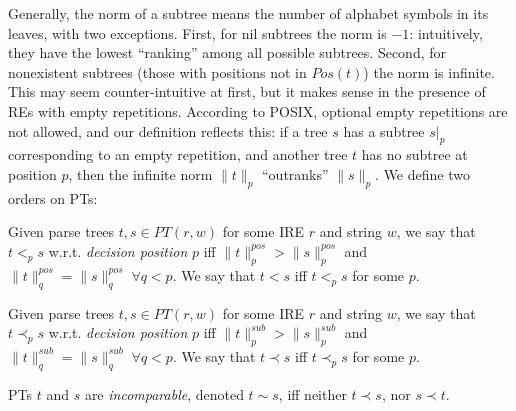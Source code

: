 \documentclass[AMA,STIX1COL]{WileyNJD-v2}
\newcommand{\pnorm}[2]{\|{#1}\|^{pos}_{#2}}
\newcommand{\snorm}[2]{\|{#1}\|^{sub}_{#2}}
\begin{document}
Generally, the norm of a subtree means the number of alphabet symbols in its leaves, with two exceptions.
First, for nil subtrees the norm is $-1$: intuitively, they have the lowest ``ranking'' among all possible subtrees.
Second, for nonexistent subtrees (those with positions not in $Pos(t)$) the norm is infinite.
This may seem counter-intuitive at first, but it makes sense in the presence of REs with empty repetitions.
According to POSIX, optional empty repetitions are not allowed, and our definition reflects this:
if a tree $s$ has a subtree $s|_p$ corresponding to an empty repetition,
and another tree $t$ has no subtree at position $p$,
then the infinite norm $\|t\|_p$ ``outranks'' $\|s\|_p$.
We define two orders on PTs:

    \begin{definition}
    \label{total_order_on_PTs}
    Given parse trees $t, s \in PT(r, w)$ for some IRE $r$ and string $w$, we say that $t <_p s$ w.r.t. \emph{decision position} $p$
    iff $\pnorm{t}{p} > \pnorm{s}{p}$ and $\pnorm{t}{q} = \pnorm{s}{q} \; \forall q < p$.
    We say that $t < s$ iff $t <_p s$ for some $p$.
    \end{definition}

    \begin{definition}
    \label{partial_order_on_PTs}
    Given parse trees $t, s \in PT(r, w)$ for some IRE $r$ and string $w$, we say that $t \prec_p s$ w.r.t. \emph{decision position} $p$ %
    iff $\snorm{t}{p} > \snorm{s}{p}$ and $\snorm{t}{q} = \snorm{s}{q} \; \forall q < p$.
    We say that $t \prec s$ iff $t \prec_p s$ for some $p$.
    \end{definition}

    \begin{definition}\label{incomparable_PTs}
    PTs $t$ and $s$ are \emph{incomparable}, denoted $t \sim s$,
    iff neither $t \prec s$, nor $s \prec t$.
    \end{definition}
\end{document}

